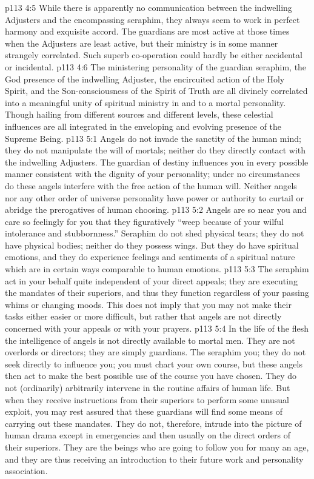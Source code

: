 \vs p113 4:5 While there is apparently no communication between the indwelling Adjusters and the encompassing seraphim, they always seem to work in perfect harmony and exquisite accord. The guardians are most active at those times when the Adjusters are least active, but their ministry is in some manner strangely correlated. Such superb co\hyp{}operation could hardly be either accidental or incidental.
\vs p113 4:6 The ministering personality of the guardian seraphim, the God presence of the indwelling Adjuster, the encircuited action of the Holy Spirit, and the Son\hyp{}consciousness of the Spirit of Truth are all divinely correlated into a meaningful unity of spiritual ministry in and to a mortal personality. Though hailing from different sources and different levels, these celestial influences are all integrated in the enveloping and evolving presence of the Supreme Being.
\vs p113 5:1 Angels do not invade the sanctity of the human mind; they do not manipulate the will of mortals; neither do they directly contact with the indwelling Adjusters. The guardian of destiny influences you in every possible manner consistent with the dignity of your personality; under no circumstances do these angels interfere with the free action of the human will. Neither angels nor any other order of universe personality have power or authority to curtail or abridge the prerogatives of human choosing.
\vs p113 5:2 Angels are so near you and care so feelingly for you that they figuratively “weep because of your wilful intolerance and stubbornness.” Seraphim do not shed physical tears; they do not have physical bodies; neither do they possess wings. But they do have spiritual emotions, and they do experience feelings and sentiments of a spiritual nature which are in certain ways comparable to human emotions.
\vs p113 5:3 The seraphim act in your behalf quite independent of your direct appeals; they are executing the mandates of their superiors, and thus they function regardless of your passing whims or changing moods. This does not imply that you may not make their tasks either easier or more difficult, but rather that angels are not directly concerned with your appeals or with your prayers.
\vs p113 5:4 In the life of the flesh the intelligence of angels is not directly available to mortal men. They are not overlords or directors; they are simply guardians. The seraphim  you; they do not seek directly to influence you; you must chart your own course, but these angels then act to make the best possible use of the course you have chosen. They do not (ordinarily) arbitrarily intervene in the routine affairs of human life. But when they receive instructions from their superiors to perform some unusual exploit, you may rest assured that these guardians will find some means of carrying out these mandates. They do not, therefore, intrude into the picture of human drama except in emergencies and then usually on the direct orders of their superiors. They are the beings who are going to follow you for many an age, and they are thus receiving an introduction to their future work and personality association.
